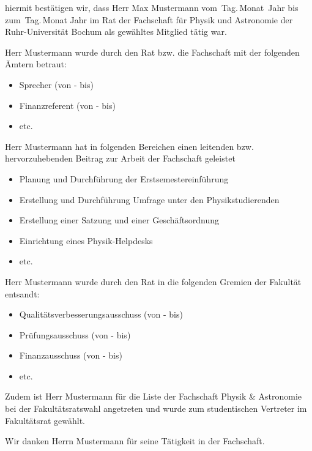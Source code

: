 \documentclass[12pt,a4paper]{g-brief2}
\begin{document}
\begin{g-brief}
  hiermit bestätigen wir, dass Herr Max Mustermann vom~Tag.\,Monat~Jahr
  bis zum~Tag.\,Monat Jahr im Rat der Fachschaft für Physik und Astronomie der
  Ruhr-Universität Bochum als gewähltes Mitglied tätig war.

  Herr Mustermann wurde durch den Rat bzw. die Fachschaft mit der folgenden Ämtern betraut:
  \begin{itemize}
  \item Sprecher (von - bis)
  \item Finanzreferent (von - bis)
  \item etc.
  \end{itemize}

  Herr Mustermann hat in folgenden Bereichen einen leitenden bzw. hervorzuhebenden Beitrag zur Arbeit der Fachschaft geleistet
  \begin{itemize}
  	\item Planung und Durchführung der Erstsemestereinführung
  	\item Erstellung und Durchführung Umfrage unter den Physikstudierenden
  	\item Erstellung einer Satzung und einer Geschäftsordnung
  	\item Einrichtung eines Physik-Helpdesks
  	\item etc.
  \end{itemize}
  
  Herr Mustermann wurde durch den Rat in die folgenden Gremien der Fakultät entsandt:
  \begin{itemize}
  \item Qualitätsverbesserungsausschuss (von - bis)
  \item Prüfungsausschuss (von - bis)
  \item Finanzausschuss (von - bis)
  \item etc.
  \end{itemize}

	Zudem ist Herr Mustermann für die Liste der Fachschaft Physik \& Astronomie bei der Fakultätsratswahl angetreten und wurde zum studentischen Vertreter im Fakultätsrat gewählt.
  
  Wir danken Herrn Mustermann für seine Tätigkeit in der Fachschaft.
\end{g-brief}
\end{document}

